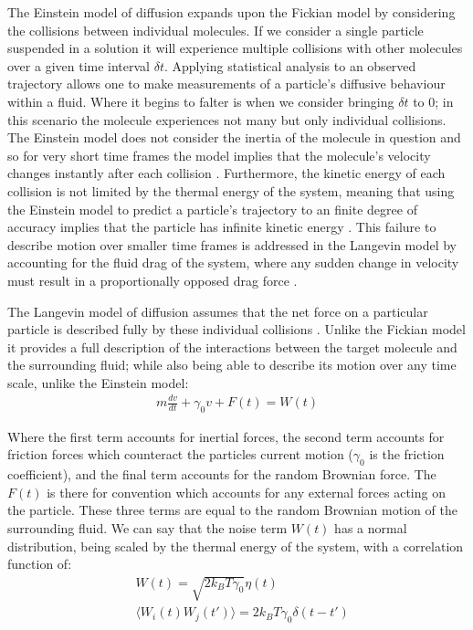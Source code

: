The Einstein model of diffusion expands upon the Fickian model 
by considering the collisions between individual molecules. If 
we consider a single particle suspended in a solution it will 
experience multiple collisions with other molecules 
\cite{Gillespie2012a} over a given time interval $\delta t$. 
Applying statistical analysis to an observed trajectory allows
one to make measurements of a particle's diffusive behaviour 
within a fluid. Where it begins to falter is when we consider 
bringing $\delta t$ to $0$; in this scenario the molecule 
experiences not many but only individual collisions. The 
Einstein model does not consider the inertia of the molecule 
in question and so for very short time frames the model 
implies that the molecule's velocity changes instantly after 
each collision \cite{Gillespie2012a, Gillespie2012b}. 
Furthermore, the kinetic energy of each collision is not 
limited by the thermal energy of the system, meaning that 
using the Einstein model to predict a particle's trajectory 
to an finite degree of accuracy implies that the particle 
has infinite kinetic energy \cite{Gillespie2012b}. This 
failure to describe motion over smaller time frames is 
addressed in the Langevin model by accounting for the fluid 
drag of the system, where any sudden change in velocity must 
result in a proportionally opposed drag force \cite{Gillespie2012c}. 

The Langevin model of diffusion assumes that the net force on 
a particular particle is described fully by these individual 
collisions \cite{Gillespie2012c}. Unlike the Fickian model it 
provides a full description of the interactions between the 
target molecule and the surrounding fluid; while also being 
able to describe its motion over any time scale, unlike the 
Einstein model:
\begin{align}
	m\frac{dv}{dt} + \gamma_0 v + F(t) = W(t)
\end{align}

Where the first term accounts for inertial forces, the second 
term accounts for friction forces which counteract the particles 
current motion ($\gamma_0$ is the friction coefficient), and 
the final term accounts for the random Brownian force. The 
$F(t)$ is there for convention which accounts for any external 
forces acting on the particle. These three terms are equal to 
the random Brownian motion of the surrounding fluid. We can 
say that the noise term $W(t)$ has a normal distribution, 
being scaled by the thermal energy of the system, with a 
correlation function of:
\begin{align}
	&W(t) = \sqrt{2k_BT\gamma_0}\eta(t) \\
	&\langle W_i(t)W_j(t')\rangle = 2k_BT\gamma_0\delta(t-t')
\end{align}

